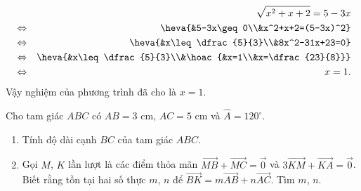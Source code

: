 \begin{bt}
{\begin{enumerate}
\begin{eqnarray*}
 && \sqrt{x^2+x+2}=5-3x \\ 
  &\Leftrightarrow& \heva{&5-3x\geq 0\\&x^2+x+2=(5-3x)^2}\\ 
  &\Leftrightarrow& \heva{&x\leq \dfrac{5}{3}\\&8x^2-31x+23=0}\\ 
  &\Leftrightarrow& \heva{&x\leq \dfrac{5}{3}\\&\hoac{&x=1\\&x=\dfrac{23}{8}}}\\ 
  &\Leftrightarrow& x=1. 
\end{eqnarray*}
Vậy nghiệm của phương trình đã cho là $x=1$.
\end{enumerate}
}
\end{bt}

\begin{bt}%
Cho tam giác $ABC$ có $AB=3$ cm, $AC=5$ cm và $\widehat{A}=120^\circ $.
\begin{enumerate}
\item Tính độ dài cạnh $BC$ của tam giác $ABC$.
\item Gọi $M$, $K$ lần lượt là các điểm thỏa mãn $ \overrightarrow{MB}+\overrightarrow{MC} =\overrightarrow{0}$ và $ 3\overrightarrow{KM}+\overrightarrow{KA} =\overrightarrow{0}$. Biết rằng tồn tại hai số thực $m$, $n$ để $\overrightarrow{BK}=m\overrightarrow{AB}+n\overrightarrow{AC}$. Tìm $m$, $n$.
\end{enumerate}
\end{bt}
